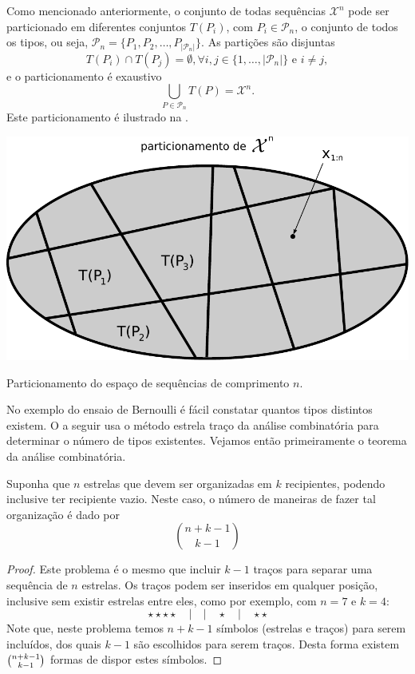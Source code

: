 Como mencionado anteriormente, o conjunto de todas sequências $\mathcal{X}^n$
pode ser particionado em diferentes conjuntos $T(P_i)$, com $P_i \in \mathcal{P}_n$,
o conjunto de todos os tipos, ou seja, $\mathcal{P}_n = \{ P_1, P_2, \ldots, P_{\vert \mathcal{P}_n \vert} \}$.
As partições são disjuntas
\begin{equation}
    T(P_i) \cap T(P_j) = \emptyset, \forall i,j \in \{1, \ldots, \vert \mathcal{P}_n \vert\} \text{ e } i \neq j,
\end{equation}
e o particionamento é exaustivo
\begin{equation}
  \bigcup_{P \in \mathcal{P}_n} T(P) = \mathcal{X}^n.
\end{equation}
Este particionamento é ilustrado na .

\begin{marginfigure}%
  \includegraphics[width=\linewidth]{figures/particao-Xn2.pdf}
  \caption{Particionamento do espaço de sequências de comprimento $n$.}
  \label{fig:particao-Xn2}
\end{marginfigure}


No exemplo do ensaio de Bernoulli é fácil constatar quantos tipos distintos existem.
O  a seguir usa o método estrela traço da análise combinatória para determinar
o número de tipos existentes. Vejamos então primeiramente o teorema da análise combinatória.

\begin{theorem}
    Suponha que $n$ estrelas que devem ser organizadas em $k$ recipientes, podendo inclusive
    ter recipiente vazio.
    Neste caso, o número de maneiras de fazer tal organização é dado por
    \begin{equation}
	\binom{n+k-1}{k-1}
    \end{equation}
\end{theorem}
\begin{proof}
Este problema é o mesmo que incluir $k-1$ traços para separar uma sequência de $n$ estrelas.
Os traços podem ser inseridos em qualquer posição, inclusive sem existir estrelas entre eles,
como por exemplo, com $n=7$ e $k=4$:
$$\star \star \star \star \quad | \quad | \quad \star \quad | \quad \star \star$$
Note que, neste problema temos $n+k-1$ símbolos (estrelas e traços) para serem incluídos, dos
quais $k-1$ são escolhidos para serem traços. Desta forma existem $\tbinom{n+k-1}{k-1}$
formas de dispor estes símbolos.
\end{proof}

